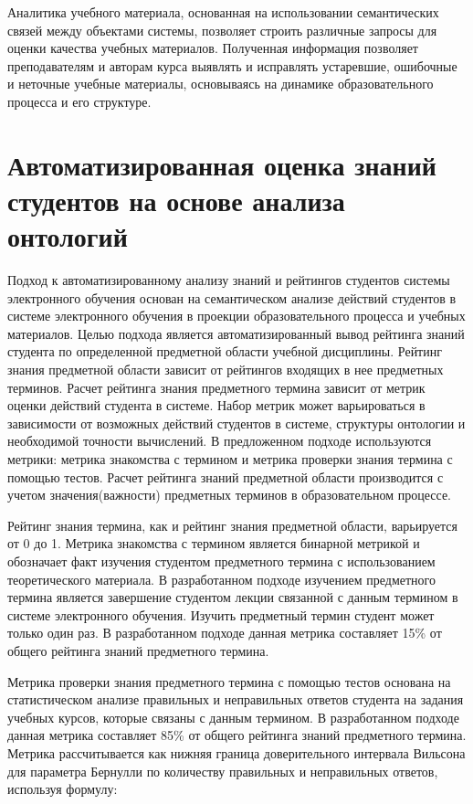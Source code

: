 Аналитика учебного материала, основанная на использовании семантических связей между объектами системы, позволяет строить различные запросы для оценки качества учебных материалов. Полученная информация позволяет преподавателям и авторам курса выявлять и исправлять устаревшие, ошибочные и неточные учебные материалы, основываясь на динамике образовательного процесса и его структуре.



\section{Автоматизированная оценка знаний студентов на основе анализа онтологий} \label{sect3_10}

Подход к автоматизированному анализу знаний и рейтингов студентов системы электронного обучения основан на семантическом анализе действий студентов в системе электронного обучения в проекции образовательного процесса и учебных материалов. Целью подхода является автоматизированный вывод рейтинга знаний студента по определенной предметной области учебной дисциплины. Рейтинг знания предметной области зависит от рейтингов входящих в нее предметных терминов. Расчет рейтинга знания предметного термина зависит от метрик оценки действий студента в системе. Набор метрик может варьироваться в зависимости от возможных действий студентов в системе, структуры онтологии и необходимой точности вычислений. В предложенном подходе используются метрики: метрика знакомства с термином и метрика проверки знания термина с помощью тестов. Расчет рейтинга знаний предметной области производится с учетом значения(важности) предметных терминов в образовательном процессе.

Рейтинг знания термина, как и рейтинг знания предметной области, варьируется от 0 до 1. Метрика знакомства с термином является бинарной метрикой и обозначает факт изучения студентом предметного термина с использованием теоретического материала. В разработанном подходе изучением предметного термина является завершение студентом лекции связанной с данным термином в системе электронного обучения. Изучить предметный термин студент может только один раз. В разработанном подходе данная метрика составляет 15\% от общего рейтинга знаний предметного термина.

Метрика проверки знания предметного термина с помощью тестов основана на статистическом анализе правильных и неправильных ответов студента на задания учебных курсов, которые связаны с данным термином. В разработанном подходе данная метрика составляет 85\% от общего рейтинга знаний предметного термина. Метрика рассчитывается как нижняя граница доверительного интервала Вильсона для параметра Бернулли по количеству правильных и неправильных ответов, используя формулу:

